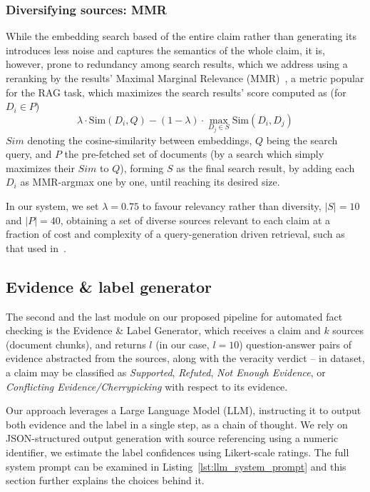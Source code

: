 \subsubsection{Diversifying sources: MMR}
While the embedding search based of the entire claim rather than generating its  introduces less noise and captures the semantics of the whole claim, it is, however, prone to redundancy among search results, which we address using a reranking by the results' Maximal Marginal Relevance (MMR)~\cite{carbonell-mmr}, a metric popular for the RAG task, which maximizes the search results' score computed as (for $D_i\in P$)
$$\lambda \cdot \mathrm{Sim}(D_i, Q) - (1-\lambda) \cdot \max_{D_j \in S} \mathrm{Sim}(D_i, D_j)$$
$Sim$ denoting the cosine-similarity between embeddings, $Q$ being the search query, and $P$ the pre-fetched set of documents (by a search which simply maximizes their $Sim$ to $Q$), forming $S$ as the final search result, by adding each $D_i$ as MMR-argmax one by one, until reaching its desired size.

In our system, we set $\lambda=0.75$ to favour relevancy rather than diversity, $|S|=10$ and $|P| = 40$, obtaining a set of diverse sources relevant to each claim at a fraction of cost and complexity of a query-generation driven retrieval, such as that used in~\cite{averitec2024}.

\subsection{Evidence \& label generator}
\label{sec:generation}
The second and the last module on our proposed pipeline for automated fact checking is the Evidence \& Label Generator, which receives a claim and $k$ sources (document chunks), and returns $l$ (in our case, $l=10$) question-answer pairs of evidence abstracted from the sources, along with the veracity verdict -- in \averitec{} dataset, a claim may be classified as \textit{Supported}, \textit{Refuted}, \textit{Not Enough Evidence}, or \textit{Conflicting Evidence/Cherrypicking} with respect to its evidence.

Our approach leverages a Large Language Model (LLM), instructing it to output both evidence and the label in a single step, as a chain of thought.
We rely on JSON-structured output generation with source referencing using a numeric identifier, we estimate the label confidences using Likert-scale ratings.
The full system prompt can be examined in Listing~\ref{lst:llm_system_prompt} and this section further explains the choices behind it.

